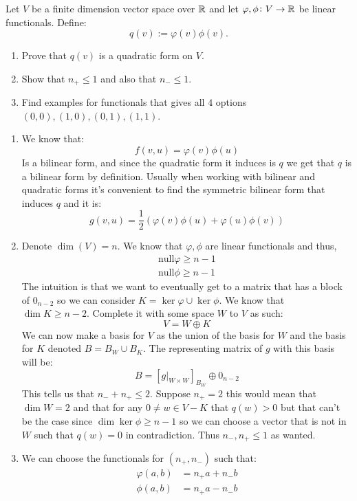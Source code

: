 \documentclass[11pt, a4paper]{article}
\begin{document}
\begin{exercise}
  Let $V$ be a finite dimension vector space over $\mathbb{R}$ and let
  $\varphi,\phi \colon V \to \mathbb{R}$ be linear functionals.
  Define:
  \[
    q(v) := \varphi(v) \phi(v).
  \]
  \begin{enumerate}
    \item[(1)] Prove that $q(v)$ is a quadratic form on $V$.
    \item[(2)] Show that $n_+ \le 1$ and also that $n_- \le 1$.
    \item[(3)] Find examples for functionals that gives all $4$ options
      $(0,0),(1,0),(0,1),(1,1)$.
  \end{enumerate}
\end{exercise}
\begin{solution} \phantom{}
\begin{enumerate}
\item[(1)]
We know that:
\[
  f(v,u) = \varphi(v)\phi(u)
\]
Is a bilinear form, and since the quadratic form it induces is $q$ we get
that $q$ is a bilinear form by definition. Usually when working with
bilinear and quadratic forms it's convenient to find the symmetric bilinear
form that induces $q$ and it is:
\[
  g(v,u) = \frac 12 \left(\varphi(v)\phi(u) + \varphi(u)\phi(v)\right)
\]
\item[(2)]
Denote $\dim(V) = n$. We know that $\varphi,\phi$ are linear functionals
and thus, 
\begin{align*}
  \mathrm{null} \varphi \geq n - 1 \\
  \mathrm{null} \phi \geq n - 1
\end{align*}
The intuition is that we want to eventually get to a matrix that has a 
block of $0_{n-2}$ so we can consider $K = \ker \varphi \cup \ker \phi$. 
We know that $\dim K \geq n - 2$. Complete it with some space $W$ to $V$ 
as such:
\[
  V = W \oplus K
\]
We can now make a basis for $V$ as the union of the basis for $W$ and the
basis for $K$ denoted $B= B_W \cup B_K$. The representing matrix of $g$
with this basis will be:
\[
  B = [g|_{W \times W}]_{B_W} \oplus 0_{n - 2}
\]
This tells us that $n_- + n_+ \le 2$. Suppose $n_+ = 2$ this would mean
that $\dim W = 2$ and that for any $0 \neq w\in V - K$ that $q(w) > 0$
but that can't be the case since $\dim \ker \phi \geq n-1$ so we can
choose a vector that is not in $W$ such that $q(w) = 0$ in contradiction.
Thus $n_-,n_+ \le 1$ as wanted.
\item[(3)]
We can choose the functionals for $(n_+,n_-)$ such that:
\begin{align*}
  \varphi(a,b) &= n_+a + n_-b \\
  \phi(a,b) &= n_+a - n_-b
\end{align*}
\end{enumerate}
\end{solution}
\end{document}
